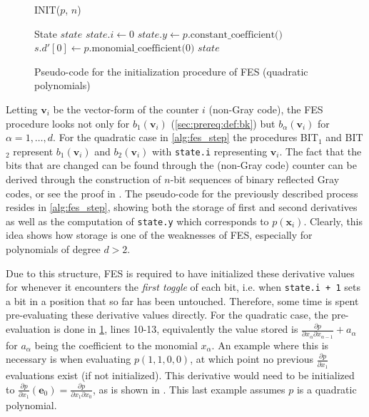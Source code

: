\begin{figure}[t]
    \begin{alg}
        \caption{INIT($p$, $n$)}\label{alg:fes_init}
        State $state$\;
        $state.i \gets 0$\;
        $state.y \gets p.\text{constant\_coefficient()}$\;
        $s.d'[0] \gets p.\text{monomial\_coefficient(0)}$\;
        \Return $state$\;
    \end{alg}
    \caption{Pseudo-code for the initialization procedure of FES (quadratic polynomials)}
\end{figure}

Letting $\mathbf{v}_i$ be the vector-form of the counter $i$ (non-Gray code), the FES procedure looks not only for $b_1(\mathbf{v}_i)$ (\cref{sec:prereq:def:bk}) but $b_\alpha(\mathbf{v}_i)$ for $\alpha=1,\dots,d$. For the quadratic case in \cref{alg:fes_step} the procedures BIT$_1$ and BIT$_2$ represent $b_1(\mathbf{v}_i)$ and $b_2(\mathbf{v}_i)$ with \texttt{state.i} representing $\mathbf{v}_i$. The fact that the bits that are changed can be found through the (non-Gray code) counter can be derived through the construction of $n$-bit sequences of binary reflected Gray codes, or see the proof in \cite{tungchoumasters}. The pseudo-code for the previously described process resides in \cref{alg:fes_step}, showing both the storage of first and second derivatives as well as the computation of \texttt{state.y} which corresponds to $p(\mathbf{x}_i)$. Clearly, this idea shows how storage is one of the weaknesses of FES, especially for polynomials of degree $d > 2$. 

Due to this structure, FES is required to have initialized these derivative values for whenever it encounters the \textit{first toggle} of each bit, i.e. when \texttt{state.i + 1} sets a bit in a position that so far has been untouched. Therefore, some time is spent pre-evaluating these derivative values directly. For the quadratic case, the pre-evaluation is done in \cref{alg:fes_init}, lines 10-13, equivalently the value stored is $\frac{\partial p}{\partial x_\alpha \partial x_{\alpha-1}} + a_\alpha$ for $a_\alpha$ being the coefficient to the monomial $x_\alpha$. An example where this is necessary is when evaluating $p(1,1,0,0)$, at which point no previous $\frac{\partial p}{\partial x_1}$ evaluations exist (if not initialized). This derivative would need to be initialized to $\frac{\partial p}{\partial x_1}(\mathbf{e}_0) = \frac{\partial p}{\partial x_1 \partial x_0}$, as is shown in \cite{tungchoumasters}. This last example assumes $p$ is a quadratic polynomial.

